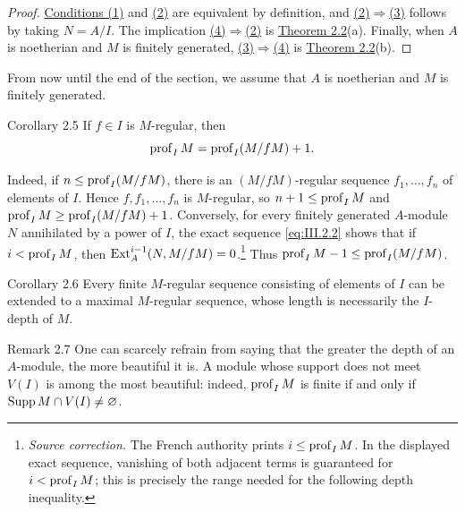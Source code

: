\begin{proof}
\hyperref[III.2.4]{Conditions (1)} and \hyperref[III.2.4]{(2)} are equivalent by definition, and
\hyperref[III.2.4]{(2)}$\Rightarrow$\hyperref[III.2.4]{(3)} follows by taking $N=A/I$. The implication
\hyperref[III.2.4]{(4)}$\Rightarrow$\hyperref[III.2.4]{(2)} is \hyperref[III.2.2]{Theorem 2.2}(a). Finally, when $A$ is noetherian and
$M$ is finitely generated, \hyperref[III.2.4]{(3)}$\Rightarrow$\hyperref[III.2.4]{(4)} is \hyperref[III.2.2]{Theorem 2.2}(b).
\end{proof}

From now until the end of the section, we assume that $A$ is
noetherian and $M$ is finitely generated.

\begin{sgastatement}{Corollary 2.5}
If $f\in I$ is $M$-regular, then
\[
  \operatorname{prof}_I M=\operatorname{prof}_I(M/fM)+1.
\]
\end{sgastatement}

Indeed, if $n\le\operatorname{prof}_I(M/fM)$, there is an $(M/fM)$-regular sequence
$f_1,\ldots,f_n$ of elements of $I$. Hence $f,f_1,\ldots,f_n$ is
$M$-regular, so $n+1\le\operatorname{prof}_I M$ and
$\operatorname{prof}_I M\ge\operatorname{prof}_I(M/fM)+1$. Conversely, for every finitely generated
$A$-module $N$ annihilated by a power of $I$, the exact sequence
  \eqref{eq:III.2.2} shows that if $i<\operatorname{prof}_I M$, then
  $\operatorname{Ext}_A^{i-1}(N,M/fM)=0$.\footnote{\textit{Source correction.}
  The French authority prints $i\le\operatorname{prof}_I M$. In the displayed exact
  sequence, vanishing of both adjacent terms is guaranteed for
  $i<\operatorname{prof}_I M$; this is precisely the range needed for the following depth
  inequality.} Thus
$\operatorname{prof}_I M-1\le\operatorname{prof}_I(M/fM)$.

\begin{sgastatement}{Corollary 2.6}
Every finite $M$-regular sequence consisting of elements of $I$ can be
extended to a maximal $M$-regular sequence, whose length is necessarily the
$I$-depth of $M$.
\end{sgastatement}

\begin{sgastatement}{Remark 2.7}
One can scarcely refrain from saying that the greater the depth of an
$A$-module, the more beautiful it is. A module whose support does not meet
$V(I)$ is among the most beautiful: indeed, $\operatorname{prof}_I M$ is finite if and
only if $\operatorname{Supp} M\cap V(I)\ne\varnothing$.
\end{sgastatement}


